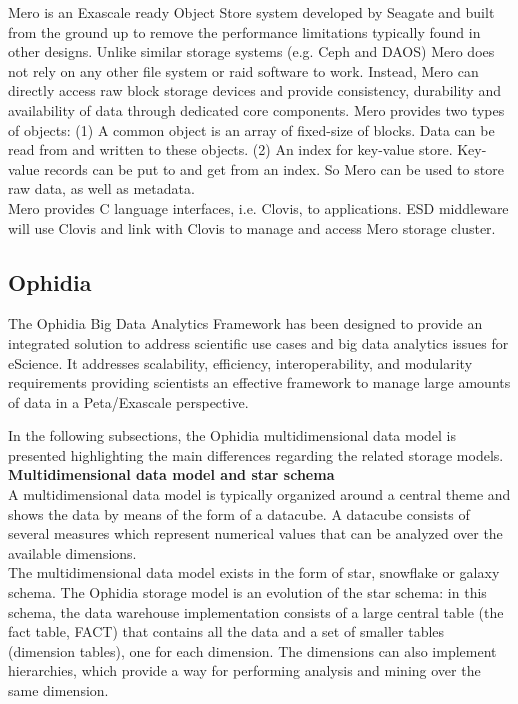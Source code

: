 Mero is an Exascale ready Object Store system developed by Seagate and built
from the ground up to remove the performance limitations typically found in
other designs. Unlike similar storage systems (e.g. Ceph and DAOS) Mero does
not rely on any other file system or raid software to work.
Instead, Mero can directly access raw block storage devices and provide consistency, durability
and availability of data through dedicated core components. Mero provides two
types of objects: (1) A common object is an array of fixed-size of blocks. Data
can be read from and written to these objects. (2) An index for key-value store.
Key-value records can be put to and get from an index. So Mero can be used to
store raw data, as well as metadata. \\
Mero provides C language interfaces, i.e. Clovis, to applications.
ESD middleware will use Clovis and link with Clovis to manage and access Mero storage cluster.

\subsection{Ophidia}
\label{Ophidia Storage Model}

The Ophidia Big Data Analytics Framework \cite{DBLP:conf/iccS/FioreDPFWA13} has been designed to provide an integrated solution to address scientific use cases and big data analytics issues for eScience.
It addresses scalability, efficiency, interoperability, and modularity requirements providing scientists an effective framework to manage large amounts of data in a Peta/Exascale perspective.

In the following subsections, the Ophidia multidimensional data model is presented highlighting the main differences regarding the related storage models.\\

\textbf{Multidimensional data model and star schema}\\

A multidimensional data model is typically organized around a central theme and shows the data by means of the form of a datacube. A datacube consists of several measures which represent numerical values that can be analyzed over the available dimensions.\\

The multidimensional data model exists in the form of star, snowflake or galaxy schema.
The Ophidia storage model is an evolution of the star schema: in this schema, the data warehouse implementation consists of a large central table (the fact table, FACT) that contains all the data and a set of smaller tables (dimension tables), one for each dimension. The dimensions can also implement hierarchies, which provide a way for performing analysis and mining over the same dimension.

